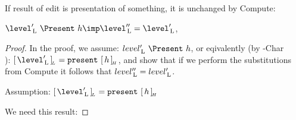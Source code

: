 
If result of edit is presentation of something, it is unchanged by {\sc Compute}: 

$\level'\L~\Present~h \imp \level''\L = \level'\L$,

\begin{proof}  In the proof, we assume: $level'\L~\Present~h$, or eqivalently (by {\sc \present-Char}\\
):
$\eqcl{\level'\L}{L} = \present~\eqcl{h}{H}$, and show that if we perform the substitutions from {\sc Compute} it follows that $level''_{\, \mathrm L} = level'_{\, \mathrm L}$.

Assumption: $\eqcl{\level'\L}{L} = \present~\eqcl{h}{H}$

We need this result: 


\end{proof}


